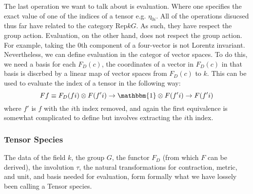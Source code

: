 \documentclass[a4paper, 11pt]{article}
\begin{document}
The last operation we want to talk about is evaluation. Where one specifies the exact value of 
one of the indices of a tensor e.g. $\eta_{0i}$. 
All of the operations disucsed thus far have related to the category $\mathrm{Rep} k G$. As such, 
they have respect the group action. Evaluation, on the other hand, does not respect the group action. 
For example, taking the $0$th component of a four-vector is not Lorentz invariant. 
Nevertheless, we can define evaluation in the categor of vector spaces. 
To do this, we need a basis for each $F_D(c)$, the coordinates of a vector in $F_D(c)$ in that basis 
is discrbed by a linear map of vector spaces from $F_D(c)$ to $k$. This can be used 
to evaluate the index of a tensor in the following way: 
\begin{equation} 
  F f \equiv F_D (f i) \otimes F (f' i) \to \mathbbm{1} \otimes F (f' i) \to F (f' i)
\end{equation}
where $f'$ is $f$ with the $i$th index removed, and again the first equivalence is somewhat
complicated to define but involves extracting the $i$th index.

\subsubsection{Tensor Species} \label{sec:tensorSpecies}

The data of the field $k$, the group $G$, the functor $F_D$ (from which $F$ can be derived), the involution $\tau$, the natural
transformations for contraction, metric, and unit, and basis needed for evaluation, 
form formally what we have lossely been calling a Tensor species.
\end{document}
